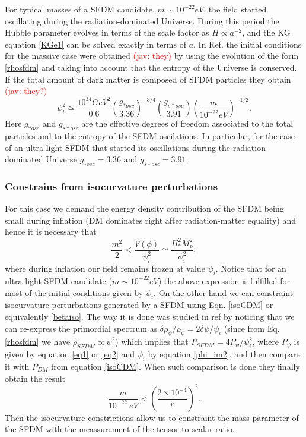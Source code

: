 \documentclass[amssymb,twocolumn,prd,nofootinbib,showpacs]{revtex4-1}
\newcommand{\jav}[1]{\textcolor{red}{(jav: #1)}}
\begin{document}
For typical masses of a SFDM candidate,  $m \sim 10^{-22} eV$, the field started oscillating during the radiation-dominated Universe. 
During this period the Hubble parameter evolves in terms of the scale factor as $H\propto a^{-2}$, and the KG 
equation \eqref{KGe1} can be solved exactly in terms of $a$. In Ref. \cite{SFrev2}  the initial 
conditions for the massive case were obtained \jav{they} by using the evolution of the form \eqref{rhosfdm} and taking into 
account that the entropy of the Universe is conserved. If the total amount of dark matter is composed of SFDM 
particles they obtain \jav{they?}
\begin{equation}\label{phi_im2}
\psi_i^2\simeq\frac{10^{34}GeV^2}{0.6}\left(\frac{g_{*osc}}{3.36}\right)^{-3/4}\left(\frac{g_{s*osc}}{3.91}\right)\left(\frac{m}{10^{-22}eV}\right)^{-1/2}.
\end{equation}
%
Here $g_{*osc}$ and $g_{s*osc}$ are the effective degrees of freedom associated to the total particles and to the entropy of the
SFDM oscilations. In particular, for the case of an ultra-light SFDM that started its oscillations during the 
radiation-dominated Universe $g_{∗osc}= 3.36$ and $g_{s∗osc}= 3.91$.

\subsubsection{Constrains from isocurvature perturbations}

For this case we demand the energy density contribution of the SFDM being small during inflation (DM dominates right after radiation-matter equality) 
and hence it is necessary that 
%
\begin{equation}
\frac{m^2}{2} < \frac{V(\phi)}{\psi_i^2}\simeq \frac{H^2_{*}M_p^2}{\psi_i^2},
\end{equation}
%
where during inflation our field remains frozen  at value $\psi_i$. 
Notice that for an ultra-light SFDM candidate  ($m\sim 10^{-22}eV$) the above expression is fulfilled for most of the 
initial conditions given by $\psi_i$. 
%
On the other hand we can constraint isocurvature perturbations generated by a SFDM using Eqn. \eqref{isoCDM} or equivalently \eqref{betaiso}. The way it is done was studied in ref \cite{SFrev2} by noticing  that  we  can  re-express  the  primordial spectrum as $\delta\rho_\psi/\rho_\psi = 2\delta\psi/\psi_i$ (since  from  Eq.   \eqref{rhosfdm} we have $\rho_{SFDM}\propto \psi^2$) which implies that $P_{SFDM}=4P_{\psi}/\psi_i^2$, where $P_\psi$ is given by equation \eqref{eq1} or  \eqref{eq2} and $\psi_i$ by equation \eqref{phi_im2}, and then compare it with $P_{DM}$ from equation \eqref{isoCDM}.  When such comparison is done they finally obtain the result
\begin{equation}\label{constm}
\frac{m}{10^{-22}\ eV}<\left(\frac{2\times 10^{-4}}{r}\right)^2.
\end{equation}
Then the isocurvature constrictions allow us to constraint the mass parameter of the SFDM with the meassurement of the tensor-to-scalar ratio.
\end{document}
